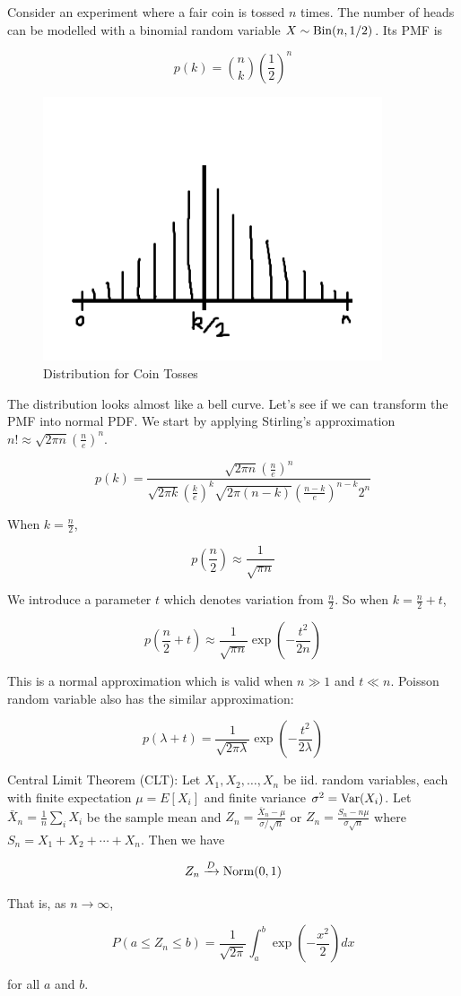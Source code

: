 Consider an experiment where a fair coin is tossed $n$ times. The number of heads can be modelled with a binomial random variable $X\sim\operatorname{Bin}(n,1/2)$. Its PMF is

\[p(k)={n \choose k} \left( \frac12 \right)^n\]

\begin{figure}[H]
	\centering
	\includegraphics[width=100mm]{35.png}
	\caption{Distribution for Coin Tosses}
\end{figure}

The distribution looks almost like a bell curve. Let's see if we can transform the PMF into normal PDF. We start by applying Stirling's approximation $n!\approx\sqrt{2\pi n}\left(\frac{n}{e}\right)^n$.

\[p(k)=\frac{\sqrt{2\pi n}\left(\frac{n}{e}\right)^n}{\sqrt{2\pi k}\left(\frac{k}{e}\right)^k \sqrt{2\pi (n-k)}\left(\frac{n-k}{e}\right)^{n-k} 2^n}\]

When $k=\frac{n}{2}$,

\[p\left(\frac{n}{2}\right)\approx\frac{1}{\sqrt{\pi n}}\]

We introduce a parameter $t$ which denotes variation from $\frac{n}{2}$. So when $k=\frac{n}{2}+t$,

\[p\left(\frac{n}{2}+t\right)\approx\frac{1}{\sqrt{\pi n}}\exp\left( -\frac{t^2}{2n} \right)\]

This is a normal approximation which is valid when $n\gg 1$ and $t\ll n$. Poisson random variable also has the similar approximation:

\[p(\lambda + t)=\frac{1}{\sqrt{2\pi\lambda}}\exp\left( -\frac{t^2}{2\lambda} \right)\]

\begin{theorem}
	Central Limit Theorem (CLT): Let $X_1, X_2, \dots, X_n$ be iid. random variables, each with finite expectation $\mu=E[X_i]$ and finite variance $\sigma^2=\operatorname{Var}(X_i)$. Let $\bar{X}_n=\frac{1}{n}\sum_i X_i$ be the sample mean and $Z_n=\frac{\bar{X}_n - \mu}{\sigma/\sqrt{n}}$ or $Z_n=\frac{S_n - n\mu}{\sigma\sqrt{n}}$ where $S_n=X_1+X_2+\cdots+X_n$. Then we have
	
	\[Z_n\xrightarrow{D}\operatorname{Norm}(0,1)\]
	
	That is, as $n\to\infty$,
	
	\[P\left( a \le Z_n \le b \right) = \frac{1}{\sqrt{2\pi}} \int_a^b \exp\left(-\frac{x^2}{2}\right) dx\]
	
	for all $a$ and $b$.
\end{theorem}


